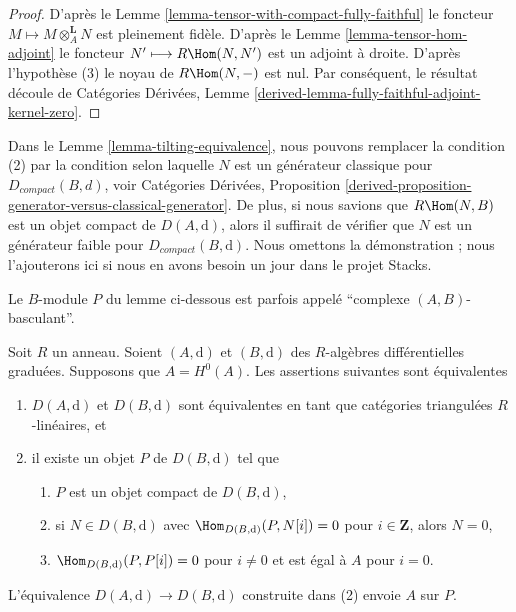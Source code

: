\begin{proof}
D'après le Lemme \ref{lemma-tensor-with-compact-fully-faithful} le foncteur $M
\longmapsto M \otimes_A^\mathbf{L} N$ est pleinement fidèle. D'après le Lemme
\ref{lemma-tensor-hom-adjoint} le foncteur $N' \longmapsto R\Hom(N, N')$ est un
adjoint à droite. D'après l'hypothèse (3) le noyau de $R\Hom(N, -)$ est nul. Par
conséquent, le résultat découle de Catégories Dérivées, Lemme
\ref{derived-lemma-fully-faithful-adjoint-kernel-zero}.
\end{proof}

\begin{remark}
\label{remark-tilting-equivalence}
Dans le Lemme \ref{lemma-tilting-equivalence}, nous pouvons remplacer la condition
(2) par la condition selon laquelle $N$ est un générateur classique pour
$D_{compact}(B, d)$, voir Catégories Dérivées, Proposition
\ref{derived-proposition-generator-versus-classical-generator}. De plus, si nous
savions que $R\Hom(N, B)$ est un objet compact de $D(A, \text{d})$, alors il
suffirait de vérifier que $N$ est un générateur faible pour $D_{compact}(B,
\text{d})$. Nous omettons la démonstration ; nous l’ajouterons ici si nous en
avons besoin un jour dans le projet Stacks.
\end{remark}

\noindent
Le $B$-module $P$ du lemme ci-dessous est parfois appelé
``complexe $(A, B)$-basculant''.

\begin{lemma}
\label{lemma-rickard}
Soit $R$ un anneau. Soient $(A, \text{d})$ et $(B, \text{d})$ des $R$-algèbres
différentielles graduées. Supposons que $A = H^0(A)$. Les assertions suivantes
sont équivalentes
\begin{enumerate}
\item $D(A, \text{d})$ et $D(B, \text{d})$ sont équivalentes en tant que catégories
triangulées $R$-linéaires, et
\item il existe un objet $P$ de $D(B, \text{d})$ tel que
\begin{enumerate}
\item $P$ est un objet compact de $D(B, \text{d})$,
\item si $N \in D(B, \text{d})$ avec $\Hom_{D(B, \text{d})}(P, N[i]) = 0$ pour $i
\in \mathbf{Z}$, alors $N = 0$,
\item $\Hom_{D(B, \text{d})}(P, P[i]) = 0$ pour $i \not = 0$ et est égal à $A$ pour $i
= 0$.
\end{enumerate}
\end{enumerate}
L'équivalence $D(A, \text{d}) \to D(B, \text{d})$ construite dans (2) envoie $A$
sur $P$.
\end{lemma}

